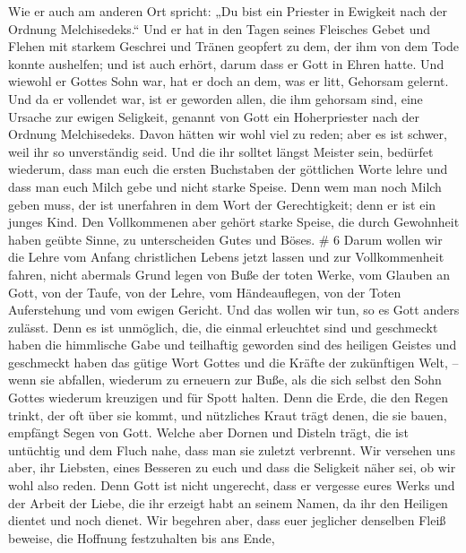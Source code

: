  Wie er auch am anderen Ort spricht: „Du bist ein Priester
in Ewigkeit nach der Ordnung Melchisedeks.``  Und er hat in
den Tagen seines Fleisches Gebet und Flehen mit starkem Geschrei und
Tränen geopfert zu dem, der ihm von dem Tode konnte aushelfen; und ist
auch erhört, darum dass er Gott in Ehren hatte.  Und wiewohl
er Gottes Sohn war, hat er doch an dem, was er litt, Gehorsam gelernt.
 Und da er vollendet war, ist er geworden allen, die ihm
gehorsam sind, eine Ursache zur ewigen Seligkeit,  genannt
von Gott ein Hoherpriester nach der Ordnung Melchisedeks. 
Davon hätten wir wohl viel zu reden; aber es ist schwer, weil ihr so
unverständig seid.  Und die ihr solltet längst Meister
sein, bedürfet wiederum, dass man euch die ersten Buchstaben der
göttlichen Worte lehre und dass man euch Milch gebe und nicht starke
Speise.  Denn wem man noch Milch geben muss, der ist
unerfahren in dem Wort der Gerechtigkeit; denn er ist ein junges Kind.
 Den Vollkommenen aber gehört starke Speise, die durch
Gewohnheit haben geübte Sinne, zu unterscheiden Gutes und Böses. \# 6
 Darum wollen wir die Lehre vom Anfang christlichen Lebens
jetzt lassen und zur Vollkommenheit fahren, nicht abermals Grund legen
von Buße der toten Werke, vom Glauben an Gott,  von der
Taufe, von der Lehre, vom Händeauflegen, von der Toten Auferstehung und
vom ewigen Gericht.  Und das wollen wir tun, so es Gott
anders zulässt.  Denn es ist unmöglich, die, die einmal
erleuchtet sind und geschmeckt haben die himmlische Gabe und teilhaftig
geworden sind des heiligen Geistes  und geschmeckt haben das
gütige Wort Gottes und die Kräfte der zukünftigen Welt, -- 
wenn sie abfallen, wiederum zu erneuern zur Buße, als die sich selbst
den Sohn Gottes wiederum kreuzigen und für Spott halten. 
Denn die Erde, die den Regen trinkt, der oft über sie kommt, und
nützliches Kraut trägt denen, die sie bauen, empfängt Segen von Gott.
 Welche aber Dornen und Disteln trägt, die ist untüchtig und
dem Fluch nahe, dass man sie zuletzt verbrennt.  Wir
versehen uns aber, ihr Liebsten, eines Besseren zu euch und dass die
Seligkeit näher sei, ob wir wohl also reden.  Denn Gott ist
nicht ungerecht, dass er vergesse eures Werks und der Arbeit der Liebe,
die ihr erzeigt habt an seinem Namen, da ihr den Heiligen dientet und
noch dienet.  Wir begehren aber, dass euer jeglicher
denselben Fleiß beweise, die Hoffnung festzuhalten bis ans Ende,
